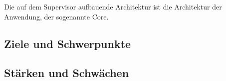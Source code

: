     Die auf dem Supervisor aufbauende Architektur ist die Architektur der Anwendung, der sogenannte Core. 

    

\subsection{Ziele und Schwerpunkte}

\subsection{Stärken und Schwächen}
